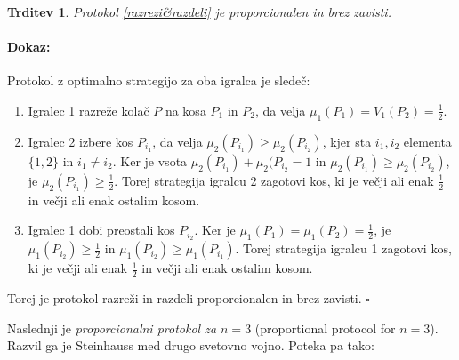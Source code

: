 \documentclass[a4paper, 12pt]{article}
\newtheorem{trditev}{Trditev}
\newenvironment{dokaz}{\paragraph{Dokaz:}}{\hfill$\square$\\}
\begin{document}
	\begin{trditev}
		Protokol \ref{razrezi&razdeli} je proporcionalen in brez zavisti.
	\end{trditev}

	\begin{dokaz}
		Protokol z optimalno strategijo za oba igralca je sledeč:
		\begin{enumerate}
			
			\item Igralec 1 razreže kolač $P$ na kosa $P_1$ in $P_2$, da velja $\mu_1 (P_1) = V_1 (P_2) = \frac{1}{2}$.
			
			\item Igralec 2 izbere kos $P_{i_1}$, da velja $\mu_2 (P_{i_1}) \geq \mu_2 (P_{i_2})$, kjer sta $i_1, i_2$ elementa $\{1, 2\}$ in $i_1 \neq i_2$. Ker je vsota $\mu_2 (P_{i_1}) + \mu_2 (P_{i_2} = 1$ in $\mu_2 (P_{i_1}) \geq \mu_2 (P_{i_2})$, je $\mu_2 (P_{i_1}) \geq \frac{1}{2}$. Torej strategija igralcu 2 zagotovi kos, ki je večji ali enak $\frac{1}{2}$ in večji ali enak ostalim kosom.
			
			\item Igralec 1 dobi preostali kos $P_{i_2}$. Ker je $\mu_1 (P_1) = \mu_1 (P_2) = \frac{1}{2}$, je $\mu_1 (P_{i_2}) \geq \frac{1}{2}$ in $\mu_1 (P_{i_2}) \geq \mu_1 (P_{i_1})$. Torej strategija igralcu 1 zagotovi kos, ki je večji ali enak $\frac{1}{2}$ in večji ali enak ostalim kosom.
			
		\end{enumerate}
	
		Torej je protokol razreži in razdeli proporcionalen in brez zavisti.
	\end{dokaz}

	Naslednji je \textit{proporcionalni protokol za $n = 3$} (proportional protocol for $n=3$). Razvil ga je Steinhauss med drugo svetovno vojno. Poteka pa tako:
	
\end{document}
